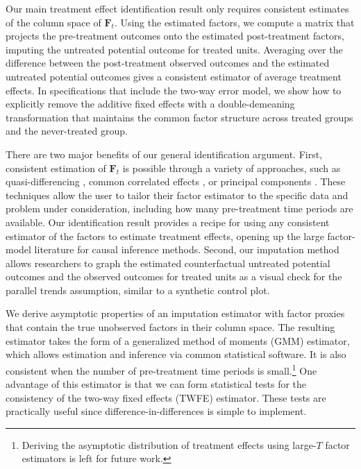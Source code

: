 \documentclass[12pt]{article}
\begin{document}
Our main treatment effect identification result only requires consistent estimates of the column space of $\bm{F}_t$. Using the estimated factors, we compute a matrix that projects the pre-treatment outcomes onto the estimated post-treatment factors, imputing the untreated potential outcome for treated units. Averaging over the difference between the post-treatment observed outcomes and the estimated untreated potential outcomes gives a consistent estimator of average treatment effects. In specifications that include the two-way error model, we show how to explicitly remove the additive fixed effects with a double-demeaning transformation that maintains the common factor structure across treated groups and the never-treated group.

There are two major benefits of our general identification argument. First, consistent estimation of $\bm{F}_t$ is possible through a variety of approaches, such as quasi-differencing \citep{Ahn_Lee_Schmidt_2013,Callaway_Karami_2020}, common correlated effects \citep{pesaran2006estimation,Westerlund_Petrova_Norkute_2019}, or principal components \citep{Bai_2009,Fan_2016,Westerlund_2020,Chan_and_Kwok_2022}. These techniques allow the user to tailor their factor estimator to the specific data and problem under consideration, including how many pre-treatment time periods are available. Our identification result provides a recipe for using any consistent estimator of the factors to estimate treatment effects, opening up the large factor-model literature for causal inference methods. Second, our imputation method allows researchers to graph the estimated counterfactual untreated potential outcomes and the observed outcomes for treated units as a visual check for the parallel trends assumption, similar to a synthetic control plot.

We derive asymptotic properties of an imputation estimator with factor proxies that contain the true unobserved factors in their column space. The resulting estimator takes the form of a generalized method of moments (GMM) estimator, which allows estimation and inference via common statistical software. It is also consistent when the number of pre-treatment time periods is small.\footnote{Deriving the asymptotic distribution of treatment effects using large-$T$ factor estimators is left for future work.} One advantage of this estimator is that we can form statistical tests for the consistency of the two-way fixed effects (TWFE) estimator. These tests are practically useful since difference-in-differences is simple to implement. 
\end{document}
